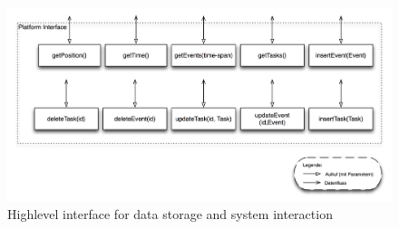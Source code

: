\begin{figure}[h!]
\centering
\includegraphics[width=16cm]{pics/data_module.png}
\caption{Highlevel interface for data storage and system interaction}
\label{gantt1}
\end{figure}